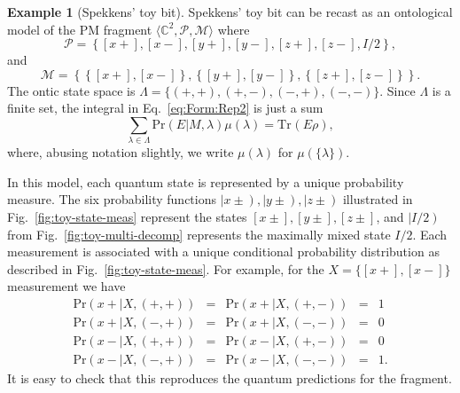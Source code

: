 \documentclass[DIV=calc,fontsize=12pt]{scrartcl} %
\theoremstyle{definition}
\newtheorem{example}[definition]{Example}
\theoremstyle{plain}
\newcommand{\RKet}[1]{\ensuremath{\left \vert #1 \right )}}
\newcommand{\Proj}[1]{\ensuremath{\left [ #1 \right ]}}
\newcommand{\Tr}[2][]{\ensuremath{\text{Tr}_{#1} \left ( #2 \right )}}
\begin{document}
\begin{example}[Spekkens' toy bit]
\label{exa:EOM:spek}
Spekkens' toy bit can be recast as an ontological model of the
PM fragment $\langle \mathbb{C}^2, \mathcal{P},
\mathcal{M} \rangle$ where
\begin{equation}
\mathcal{P} = \left \{\Proj{x+},\Proj{x-}, \Proj{y+},\Proj{y-},
\Proj{z+},\Proj{z-},I/2 \right \},
\end{equation}
and
\begin{equation}
\mathcal{M} = \left \{ \left \{ \Proj{x+},\Proj{x-} \right \},
\left \{\Proj{y+},\Proj{y-} \right \}, \left \{
\Proj{z+},\Proj{z-} \right \} \right \}.
\end{equation}
The ontic state space is $\Lambda = \{(+,+),(+,-),(-,+),(-,-)\}$.
Since $\Lambda$ is a finite set, the integral in
Eq.~\eqref{eq:Form:Rep2} is just a sum
\begin{equation}
\sum_{\lambda \in \Lambda} \text{Pr}(E|M,\lambda)\mu(\lambda) =
\Tr{E \rho},
\end{equation}
where, abusing notation slightly, we write $\mu(\lambda)$ for
$\mu(\{\lambda\})$.

In this model, each quantum state is represented by a unique
probability measure.  The six probability functions $\RKet{x \pm},
\RKet{y \pm}, \RKet{z \pm}$ illustrated in
Fig.~\ref{fig:toy-state-meas} represent the states $\Proj{x \pm},
\Proj{y \pm}, \Proj{z \pm}$, and $\RKet{I/2}$ from
Fig.~\ref{fig:toy-multi-decomp} represents the maximally mixed state
$I/2$.  Each measurement is associated with a unique conditional
probability distribution as described in
Fig.~\ref{fig:toy-state-meas}.  For example, for the $X =
\{\Proj{x+},\Proj{x-}\}$ measurement we have
\begin{equation}
\begin{array}{lllll}
\text{Pr}(x+|X,(+,+)) & = & \text{Pr}(x+|X,(+,-)) & = & 1 \\
\text{Pr}(x+|X,(-,+)) & = & \text{Pr}(x+|X,(-,-)) & = & 0 \\
\text{Pr}(x-|X,(+,+)) & = & \text{Pr}(x-|X,(+,-)) & = & 0 \\
\text{Pr}(x-|X,(-,+)) & = & \text{Pr}(x-|X,(-,-)) & = & 1.
\end{array}
\end{equation}
It is easy to check that this reproduces the quantum predictions for
the fragment.
\end{example}
\end{document}
